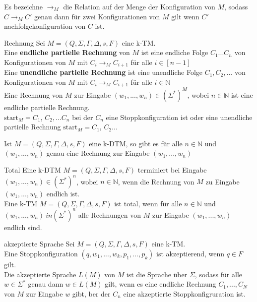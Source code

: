 
Es bezeichne $\rightarrow_M$ die Relation auf der Menge der Konfiguration von $M$, 
sodass $C \rightarrow_M C'$ genau dann für zwei Konfigurationen von $M$ gilt wenn $C'$ nachfolgekonfiguration von $C$ ist. 

\begin{defn}{Rechnung}
    Sei $M = (Q, \Sigma, \Gamma, \Delta, s, F)$ eine k-TM. \\
    
    Eine \textbf{endliche partielle Rechnung} von $M$ ist eine endliche Folge
    $C_1...C_n$ von Konfigurationen von $M$ mit $C_i \rightarrow_M C_{i+1}$ für alle $i \in [n-1]$ \\

    Eine \textbf{unendliche partielle Rechnung} ist eine unendliche Folge $C_1,C_2,...$ von Konfigurationen von $M$
    mit $C_i \rightarrow_M C_{i+1}$ für alle $i \in \mathbb{N}$ \\

    Eine Rechnung von $M$ zur Eingabe $(w_1,...,w_n) \in (\Sigma^*)^M$, wobei $n \in \mathbb{N}$ ist eine endliche partielle Rechnung. \\
    $\text{start}_M = C_1$, $C_2,...C_n$ bei der $C_n$ eine Stoppkonfiguration ist oder eine unendliche partielle Rechnung $\text{start}_M = C_1$, $C_2...$ 
\end{defn}

\begin{bem}
    Ist $M = (Q, \Sigma, \Gamma, \Delta, s, F)$ eine k-DTM, so gibt es für alle $n \in \mathbb{N}$ und $(w_1,...,w_n)$
    genau eine Rechnung zur Eingabe $(w_1,...,w_n)$
\end{bem}

\begin{defn}{Total}
    Eine k-DTM $M = (Q, \Sigma, \Gamma, \Delta, s, F)$ terminiert bei Eingabe $(w_1,...,w_n) \in (\Sigma^*)^n$,
    wobei $n \in \mathbb{N}$, wenn die Rechnung von $M$ zu Eingabe $(w_1,...,w_n)$ endlich ist. \\

    Eine k-TM $M = (Q, \Sigma, \Gamma, \Delta, s, F)$ ist total,  wenn für alle $n \in \mathbb{N}$ und 
    $(w_1,...,w_n) \ in (\Sigma^*)^n$ alle Rechnungen von $M$ zur Eingabe $(w_1,...,w_n)$ endlich sind.
\end{defn}

\begin{defn}{akzeptierte Sprache}
    Sei $M = (Q, \Sigma, \Gamma, \Delta, s, F)$ eine k-TM. \\
    Eine Stoppkonfiguration $(q,w_1,...,w_k,p_1,...,p_k)$ ist akzeptierend, wenn $q \in F$ gilt. \\

    Die akzeptierte Sprache $L(M)$ von $M$ ist die Sprache über $\Sigma$, sodass für alle $w \in \Sigma^*$ genau dann $w \in L(M)$ gilt,
    wenn es eine endliche Rechnung $C_1,...,C_N$ von $M$ zur Eingabe $w$ gibt, ber der $C_n$ eine akzeptierte Stoppkonfigruration ist.
\end{defn}

